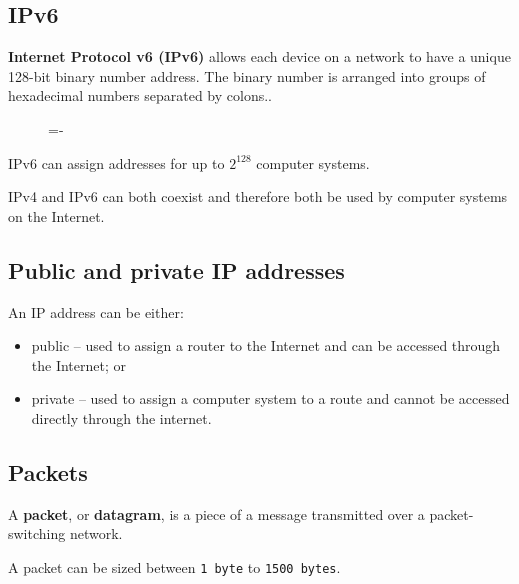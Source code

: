 \documentclass[a4paper]{systems-software}
\begin{document}
\subsection*{IPv6}

\textbf{Internet Protocol v6 (IPv6)} allows each device on a network to have a unique 128-bit binary number address. The binary number is arranged into groups of hexadecimal numbers separated by colons..

\begin{figure}[H]
	\lineskip=-\fboxrule
\end{figure}

IPv6 can assign addresses for up to $2^{128}$ computer systems.

IPv4 and IPv6 can both coexist and therefore both be used by computer systems on the Internet.


\subsection*{Public and private IP addresses}

An IP address can be either:
\begin{itemize}
	\item public -- used to assign a router to the Internet and can be accessed through the Internet; or
	\item private -- used to assign a computer system to a route and cannot be accessed directly through the internet.
\end{itemize}


\subsection*{Packets}

A \textbf{packet}, or \textbf{datagram}, is a piece of a message transmitted over a packet-switching network.

A packet can be sized between \texttt{1 byte} to \texttt{1500 bytes}.
\end{document}
